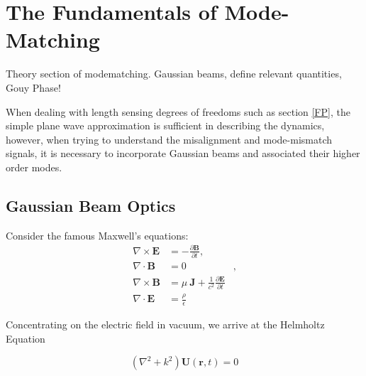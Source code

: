 \chapter{The Fundamentals of Mode-Matching}\label{fund_mm}
	Theory section of modematching. Gaussian beams, define relevant quantities, Gouy Phase!
	
	When dealing with length sensing degrees of freedoms such as section \ref{FP}, the simple plane wave approximation is sufficient in describing the dynamics, however, when trying to understand the misalignment and mode-mismatch signals, it is necessary to incorporate Gaussian beams and associated their higher order modes.
		\section{Gaussian Beam Optics}
		Consider the famous Maxwell's equations:
		\begin{equation}
		\label{18.1:1}
		\begin{aligned}
		 \nabla \times \mathbf{E} &=-\frac{\partial \mathbf{B}} {\partial t},&
		\\\nabla \cdot \mathbf{B} &=0&,
		\\\nabla \times \mathbf{B} &= \mu\ \mathbf{J} + \frac{1}{c^2} \frac{\partial \mathbf{E}} {\partial t}&
		\\
		\nabla \cdot \mathbf{E} &= \frac{\rho}{\epsilon}&
		\end{aligned}
		\end{equation}
		
		Concentrating on the electric field in vacuum, we arrive at the Helmholtz Equation
		
		\begin{equation}\label{Helmholtz}
		(\nabla^2 + k^2 ) \mathbf{U}(\mathbf{r},t) = 0
		\end{equation}
	
